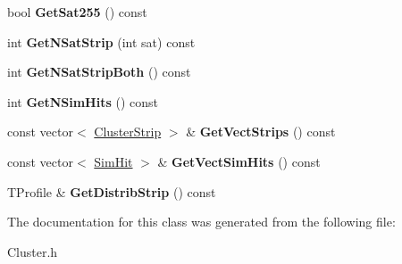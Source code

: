 \begin{DoxyCompactItemize}
bool {\bfseries Get\+Sat255} () const
\item 
\mbox{\label{class_cluster_abae039c6aed71f56a7f9c89dc67a3e69}} 
int {\bfseries Get\+N\+Sat\+Strip} (int sat) const
\item 
\mbox{\label{class_cluster_a418a5257e0d7e580df351bc40955b52f}} 
int {\bfseries Get\+N\+Sat\+Strip\+Both} () const
\item 
\mbox{\label{class_cluster_a32c8ea238dec3006716adcb8a5f36ed9}} 
int {\bfseries Get\+N\+Sim\+Hits} () const
\item 
\mbox{\label{class_cluster_a732526cd08dfd99444e8c61f6515c6cd}} 
const vector$<$ \mbox{\hyperlink{class_cluster_strip}{Cluster\+Strip}} $>$ \& {\bfseries Get\+Vect\+Strips} () const
\item 
\mbox{\label{class_cluster_a766cf2dc68718f7c7a437077e7c9e2d2}} 
const vector$<$ \mbox{\hyperlink{class_sim_hit}{Sim\+Hit}} $>$ \& {\bfseries Get\+Vect\+Sim\+Hits} () const
\item 
\mbox{\label{class_cluster_acabc82584a0c3e5d9b612b51671f40e4}} 
T\+Profile \& {\bfseries Get\+Distrib\+Strip} () const
\end{DoxyCompactItemize}


The documentation for this class was generated from the following file\+:\begin{DoxyCompactItemize}
\item 
Cluster.\+h\end{DoxyCompactItemize}
